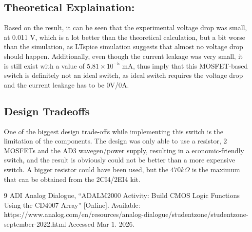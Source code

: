 \documentclass[12pt]{article}
\begin{document}
    

    \subsection{Theoretical Explaination:}

    Based on the result, it can be seen that the experimental voltage drop was small, at 0.011 V, which is a lot better than the theoretical calculation, but a bit worse than the simulation, as LTspice simulation suggests that almost no voltage drop should happen. Additionally, even though the current leakage was very small, it is still exist with a value of \(5.81 \times 10^{-5}\) mA, thus imply that this MOSFET-based switch is definitely not an ideal switch, as ideal switch requires the voltage drop and the current leakage has to be 0V/0A. 
    
    \subsection{Design Tradeoffs}

    One of the biggest design trade-offs while implementing this switch is the limitation of the components. The design was only able to use a resistor, 2 MOSFETs and the AD3 wavegen/power supply, resulting in a economic-friendly switch, and the result is obviously could not be better than a more expensive switch. A bigger resistor could have been used, but the \(470k\Omega\) is the maximum that can be obtained from the 2CI4/2EI4 kit. 



    \newpage

    \begin{thebibliography}{9}
        ADI Analog Dialogue, ``ADALM2000 Activity: Build CMOS Logic Functions Using the CD4007 Array'' 
        [Online]. Available: https://www.analog.com/en/resources/analog-dialogue/studentzone/studentzone-september-2022.html Accessed Mar 1. 2026.
    \end{thebibliography}

    

    
\end{document}
